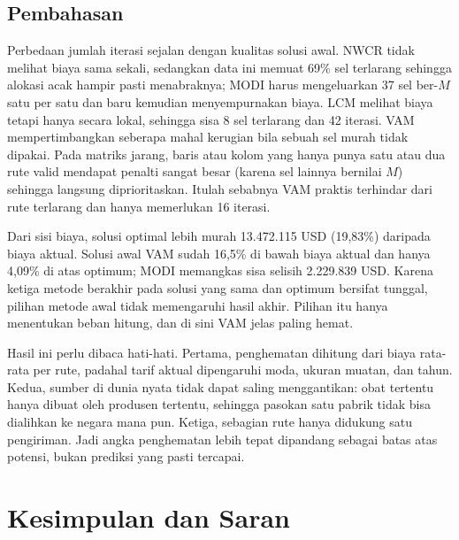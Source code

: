 \documentclass[a4paper,11pt]{article}
\begin{document}
\subsection{Pembahasan}
Perbedaan jumlah iterasi sejalan dengan kualitas solusi awal. NWCR tidak melihat biaya sama sekali, sedangkan data ini memuat 69\% sel terlarang sehingga alokasi acak hampir pasti menabraknya; MODI harus mengeluarkan 37 sel ber-$M$ satu per satu dan baru kemudian menyempurnakan biaya. LCM melihat biaya tetapi hanya secara lokal, sehingga sisa 8 sel terlarang dan 42 iterasi. VAM mempertimbangkan seberapa mahal kerugian bila sebuah sel murah tidak dipakai. Pada matriks jarang, baris atau kolom yang hanya punya satu atau dua rute valid mendapat penalti sangat besar (karena sel lainnya bernilai $M$) sehingga langsung diprioritaskan. Itulah sebabnya VAM praktis terhindar dari rute terlarang dan hanya memerlukan 16 iterasi.

Dari sisi biaya, solusi optimal lebih murah 13.472.115 USD (19,83\%) daripada biaya aktual. Solusi awal VAM sudah 16,5\% di bawah biaya aktual dan hanya 4,09\% di atas optimum; MODI memangkas sisa selisih 2.229.839 USD. Karena ketiga metode berakhir pada solusi yang sama dan optimum bersifat tunggal, pilihan metode awal tidak memengaruhi hasil akhir. Pilihan itu hanya menentukan beban hitung, dan di sini VAM jelas paling hemat.

Hasil ini perlu dibaca hati-hati. Pertama, penghematan dihitung dari biaya rata-rata per rute, padahal tarif aktual dipengaruhi moda, ukuran muatan, dan tahun. Kedua, sumber di dunia nyata tidak dapat saling menggantikan: obat tertentu hanya dibuat oleh produsen tertentu, sehingga pasokan satu pabrik tidak bisa dialihkan ke negara mana pun. Ketiga, sebagian rute hanya didukung satu pengiriman. Jadi angka penghematan lebih tepat dipandang sebagai batas atas potensi, bukan prediksi yang pasti tercapai.

\section{Kesimpulan dan Saran}
\label{sec:kesimpulan}
\end{document}
